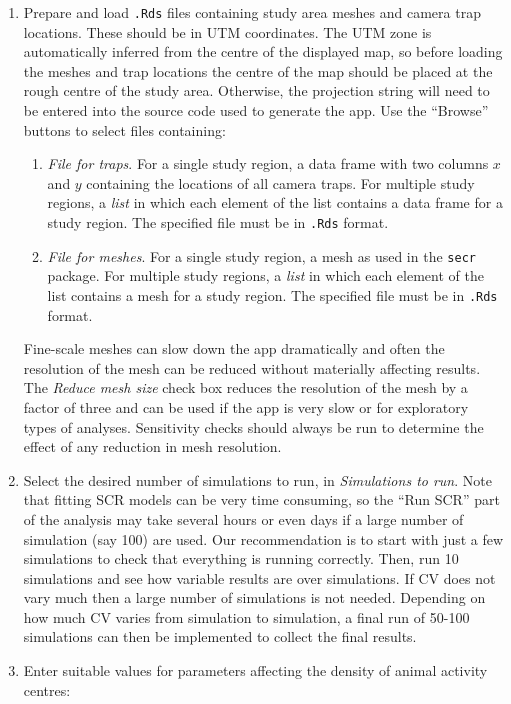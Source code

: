 \documentclass[a4paper,11pt]{article} %
\begin{document}
\begin{enumerate}
\item Prepare and load \texttt{.Rds} files containing study area meshes and camera trap locations. These should be in UTM coordinates. The UTM zone is automatically inferred from the centre of the displayed map, so before loading the meshes and trap locations the centre of the map should be placed at the rough centre of the study area. Otherwise, the projection string will need to be entered into the source code used to generate the app. Use the ``Browse'' buttons to select files containing:
\begin{enumerate}
\item \textit{File for traps}. For a single study region, a data frame with two columns $x$ and $y$ containing the locations of all camera traps. For multiple study regions, a {\it list} in which each element of the list contains a data frame for a study region. The specified file must be in \texttt{.Rds} format.
\item \textit{File for meshes}. For a single study region, a mesh as used in the \texttt{secr} package. For multiple study regions, a {\it list} in which each element of the list contains a mesh for a study region. The specified file must be in \texttt{.Rds} format.
\end{enumerate}
Fine-scale meshes can slow down the app dramatically and often the resolution of the mesh can be reduced without materially affecting results. The \textit{Reduce mesh size} check box reduces the resolution of the mesh by a factor of three and can be used if the app is very slow or for exploratory types of analyses. Sensitivity checks should always be run to determine the effect of any reduction in mesh resolution.
\item Select the desired number of simulations to run, in \textit{Simulations to run}. Note that fitting SCR models can be very time consuming, so the ``Run SCR'' part of the analysis may take several hours or even days if a large number of simulation (say 100) are used. Our recommendation is to start with just a few simulations to check that everything is running correctly. Then, run 10 simulations and see how variable results are over simulations. If CV does not vary much then a large number of simulations is not needed. Depending on how much CV varies from simulation to simulation, a final run of 50-100 simulations can then be implemented to collect the final results.
\item Enter suitable values for parameters affecting the density of animal activity centres:

\end{enumerate}
\end{document}
